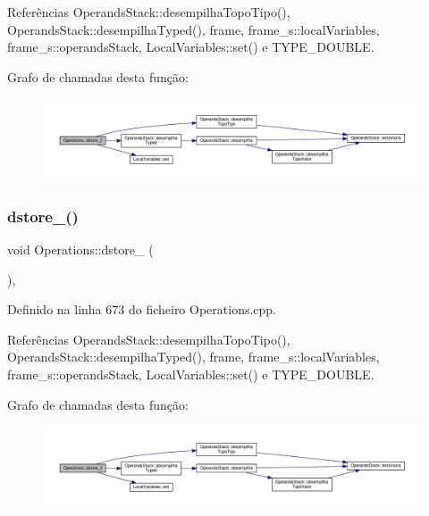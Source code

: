Referências Operands\+Stack\+::desempilha\+Topo\+Tipo(), Operands\+Stack\+::desempilha\+Typed(), frame, frame\+\_\+s\+::local\+Variables, frame\+\_\+s\+::operands\+Stack, Local\+Variables\+::set() e T\+Y\+P\+E\+\_\+\+D\+O\+U\+B\+LE.

Grafo de chamadas desta função\+:\nopagebreak
\begin{figure}[H]
\begin{center}
\leavevmode
\includegraphics[width=350pt]{classOperations_ad0f97963e6eb2482f5032fdb3465ec94_cgraph}
\end{center}
\end{figure}
\mbox{\label{classOperations_a161cba32105238617b0cfd5c47afdfe4}} 
\subsubsection{\texorpdfstring{dstore\+\_()}{dstore\_3()}}
{\footnotesize\ttfamily void Operations\+::dstore\+\_ (\begin{DoxyParamCaption}{ }\end{DoxyParamCaption})\hspace{0.3cm}{\ttfamily [static]}, {\ttfamily [private]}}



Definido na linha 673 do ficheiro Operations.\+cpp.



Referências Operands\+Stack\+::desempilha\+Topo\+Tipo(), Operands\+Stack\+::desempilha\+Typed(), frame, frame\+\_\+s\+::local\+Variables, frame\+\_\+s\+::operands\+Stack, Local\+Variables\+::set() e T\+Y\+P\+E\+\_\+\+D\+O\+U\+B\+LE.

Grafo de chamadas desta função\+:\nopagebreak
\begin{figure}[H]
\begin{center}
\leavevmode
\includegraphics[width=350pt]{classOperations_a161cba32105238617b0cfd5c47afdfe4_cgraph}
\end{center}
\end{figure}
\mbox{\label{classOperations_aa994b0cf4aead2646fa5bb90c2643664}} 

